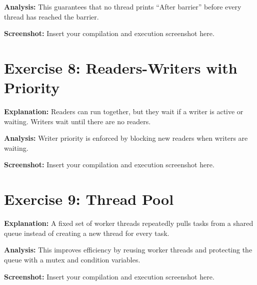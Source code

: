 \documentclass{article}
\begin{document}
\textbf{Analysis:} This guarantees that no thread prints ``After barrier'' before every thread has reached the barrier.

\textbf{Screenshot:} Insert your compilation and execution screenshot here.

\section{Exercise 8: Readers-Writers with Priority}

\textbf{Explanation:} Readers can run together, but they wait if a writer is active or waiting. Writers wait until there are no readers.

\textbf{Analysis:} Writer priority is enforced by blocking new readers when writers are waiting.

\textbf{Screenshot:} Insert your compilation and execution screenshot here.

\section{Exercise 9: Thread Pool}

\textbf{Explanation:} A fixed set of worker threads repeatedly pulls tasks from a shared queue instead of creating a new thread for every task.

\textbf{Analysis:} This improves efficiency by reusing worker threads and protecting the queue with a mutex and condition variables.

\textbf{Screenshot:} Insert your compilation and execution screenshot here.
\end{document}
